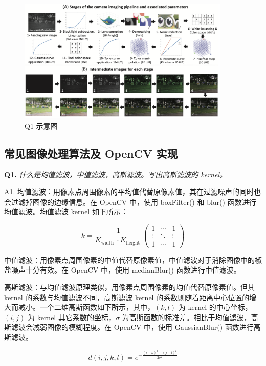 \documentclass[cn,10pt,math=newtx,citestyle=gb7714-2015,bibstyle=gb7714-2015]{elegantbook}
\begin{document}
\begin{figure}[h]
  \centering
  \includegraphics[width=0.9\textwidth]{image/2.2.2.q1.png}
  \caption{Q1 示意图}
\end{figure}


\subsection{常见图像处理算法及 OpenCV 实现}

\textbf{Q1.} \textit{什么是均值滤波，中值滤波，高斯滤波。写出高斯滤波的 kernel。}

A1. 均值滤波：用像素点周围像素的平均值代替原像素值，其在过滤噪声的同时也会过滤掉图像的边缘信息。在 OpenCV 中，使用 boxFilter() 和 blur() 函数进行均值滤波。均值滤波 kernel 如下所示：

\begin{equation}
k=\frac{1}{K_{\text {width }} \cdot K_{\text {height }}}\left(\begin{array}{ccc}
1 & \cdots & 1 \\
\vdots & \ddots & \vdots \\
1 & \cdots & 1
\end{array}\right)
\end{equation}

中值滤波：用像素点周围像素的中值代替原像素值，中值滤波对于消除图像中的椒盐噪声十分有效。在 OpenCV 中，使用 medianBlur() 函数进行中值滤波。

高斯滤波：与均值滤波原理类似，用像素点周围像素的均值代替原像素值。但其 kernel 的系数与均值滤波不同，高斯滤波 kernel 的系数则随着距离中心位置的增大而减小。一个二维高斯函数如下所示，其中，$(k, l)$ 为 kernel 的中心坐标，$(i, j)$ 为 kernel 其它系数的坐标，$\sigma$ 为高斯函数的标准差。相比于均值滤波，高斯滤波会减弱图像的模糊程度。在 OpenCV 中，使用 GaussianBlur() 函数进行高斯滤波。

\begin{equation}
d(i, j, k, l)=e^{-\frac{(i-k)^{2}+(j-l)^{2}}{2 \sigma^{2}}}
\end{equation}
\end{document}
